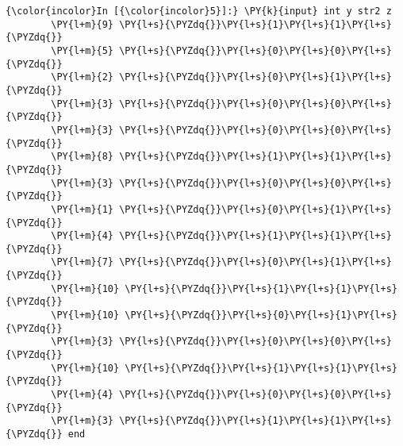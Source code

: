 \documentclass[11pt,notitlepage]{article}\usepackage[]{graphicx}\usepackage[]{color}
\makeatletter
\newenvironment{kframe}{%
 \def\at@end@of@kframe{}%
 \ifinner\ifhmode%
  \def\at@end@of@kframe{\end{minipage}}%
  \begin{minipage}{\columnwidth}%
 \fi\fi%
 \def\FrameCommand##1{\hskip\@totalleftmargin \hskip-\fboxsep
 \colorbox{shadecolor}{##1}\hskip-\fboxsep
     \hskip-\linewidth \hskip-\@totalleftmargin \hskip\columnwidth}%
 \MakeFramed {\advance\hsize-\width
   \@totalleftmargin\z@ \linewidth\hsize
   \@setminipage}}%
 {\par\unskip\endMakeFramed%
 \at@end@of@kframe}
\newenvironment{knitrout}{}{} %
\makeatother
\begin{document}
\begin{enumerate}[a)]
\begin{knitrout}
\begin{kframe}
    \begin{Verbatim}[commandchars=\\\{\}]
{\color{incolor}In [{\color{incolor}5}]:} \PY{k}{input} int y str2 z
        \PY{l+m}{9} \PY{l+s}{\PYZdq{}}\PY{l+s}{1}\PY{l+s}{1}\PY{l+s}{\PYZdq{}}
        \PY{l+m}{5} \PY{l+s}{\PYZdq{}}\PY{l+s}{0}\PY{l+s}{0}\PY{l+s}{\PYZdq{}}
        \PY{l+m}{2} \PY{l+s}{\PYZdq{}}\PY{l+s}{0}\PY{l+s}{1}\PY{l+s}{\PYZdq{}}
        \PY{l+m}{3} \PY{l+s}{\PYZdq{}}\PY{l+s}{0}\PY{l+s}{0}\PY{l+s}{\PYZdq{}}	
        \PY{l+m}{3} \PY{l+s}{\PYZdq{}}\PY{l+s}{0}\PY{l+s}{0}\PY{l+s}{\PYZdq{}}
        \PY{l+m}{8} \PY{l+s}{\PYZdq{}}\PY{l+s}{1}\PY{l+s}{1}\PY{l+s}{\PYZdq{}}
        \PY{l+m}{3} \PY{l+s}{\PYZdq{}}\PY{l+s}{0}\PY{l+s}{0}\PY{l+s}{\PYZdq{}}
        \PY{l+m}{1} \PY{l+s}{\PYZdq{}}\PY{l+s}{0}\PY{l+s}{1}\PY{l+s}{\PYZdq{}}
        \PY{l+m}{4} \PY{l+s}{\PYZdq{}}\PY{l+s}{1}\PY{l+s}{1}\PY{l+s}{\PYZdq{}}
        \PY{l+m}{7} \PY{l+s}{\PYZdq{}}\PY{l+s}{0}\PY{l+s}{1}\PY{l+s}{\PYZdq{}}
        \PY{l+m}{10} \PY{l+s}{\PYZdq{}}\PY{l+s}{1}\PY{l+s}{1}\PY{l+s}{\PYZdq{}}
        \PY{l+m}{10} \PY{l+s}{\PYZdq{}}\PY{l+s}{0}\PY{l+s}{1}\PY{l+s}{\PYZdq{}}
        \PY{l+m}{3} \PY{l+s}{\PYZdq{}}\PY{l+s}{0}\PY{l+s}{0}\PY{l+s}{\PYZdq{}}
        \PY{l+m}{10} \PY{l+s}{\PYZdq{}}\PY{l+s}{1}\PY{l+s}{1}\PY{l+s}{\PYZdq{}}
        \PY{l+m}{4} \PY{l+s}{\PYZdq{}}\PY{l+s}{0}\PY{l+s}{0}\PY{l+s}{\PYZdq{}}
        \PY{l+m}{3} \PY{l+s}{\PYZdq{}}\PY{l+s}{1}\PY{l+s}{1}\PY{l+s}{\PYZdq{}} end
\end{Verbatim}



\end{kframe}
\end{knitrout}
\end{enumerate}
\end{document}
